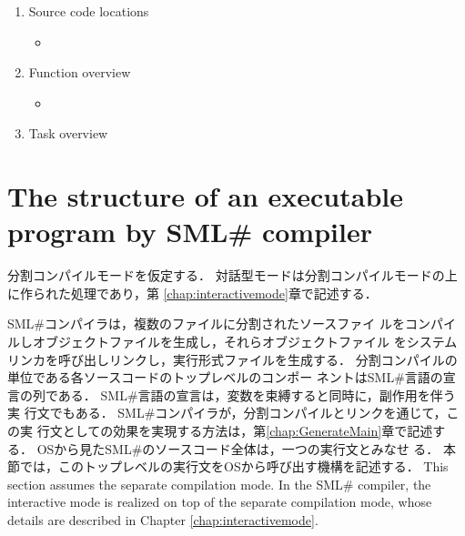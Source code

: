 \documentclass{jbook}
\newcommand{\txt}[2]{#2}
\newcommand{\smlsharp}{SML\#}
\begin{document}
\begin{enumerate}
\item \txt{ソースロケーション}{Source code locations}
\begin{itemize}
\item 
\end{itemize}

\item \txt{機能概要}{Function overview}
\begin{itemize}
\item 
\end{itemize}
\item \txt{処理概要}{Task overview}

\end{enumerate}


\section{\txt{\smlsharp{}コンパイラが生成する実行形式プログラムの構造}
{The structure of an executable program by \smlsharp{} compiler}}
\label{sec:ProgramStartup.generateExec}

\ifjp%
	分割コンパイルモードを仮定する．
	対話型モードは分割コンパイルモードの上に作られた処理であり，第
\ref{chap:interactivemode}章で記述する．

	\smlsharp{}コンパイラは，複数のファイルに分割されたソースファイ
ルをコンパイルしオブジェクトファイルを生成し，それらオブジェクトファイル
をシステムリンカを呼び出しリンクし，実行形式ファイルを生成する．
	分割コンパイルの単位である各ソースコードのトップレベルのコンポー
ネントは\smlsharp{}言語の宣言の列である．
	\smlsharp{}言語の宣言は，変数を束縛すると同時に，副作用を伴う実
行文でもある．
	\smlsharp{}コンパイラが，分割コンパイルとリンクを通じて，この実
行文としての効果を実現する方法は，第\ref{chap:GenerateMain}章で記述する．
	OSから見た\smlsharp{}のソースコード全体は，一つの実行文とみなせ
る．
	本節では，このトップレベルの実行文をOSから呼び出す機構を記述する．
\else%
	This section assumes the separate compilation mode.
	In the \smlsharp{} compiler, the interactive mode is realized
on top of the separate compilation mode, whose details are described in
Chapter \ref{chap:interactivemode}.
\end{document}
